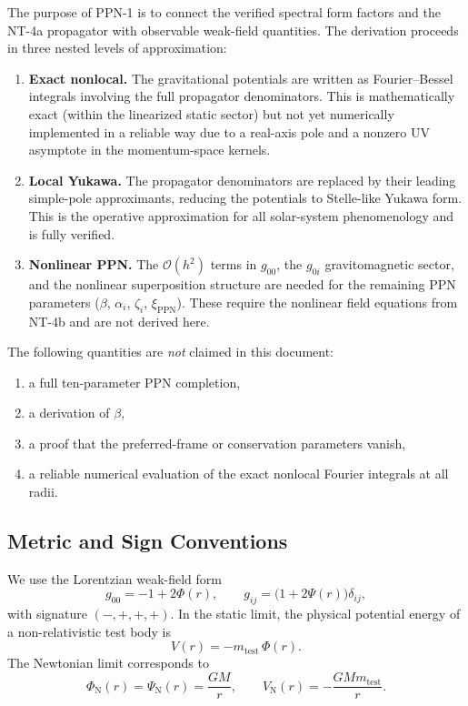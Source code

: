 \documentclass[11pt,a4paper]{article}
\newcommand{\order}{\mathcal{O}}
\begin{document}
The purpose of PPN-1 is to connect the verified spectral form factors and
the NT-4a propagator with observable weak-field quantities.  The derivation
proceeds in three nested levels of approximation:

\begin{enumerate}[label=\textbf{Level \arabic*}:, leftmargin=4em]
  \item \textbf{Exact nonlocal.}  The gravitational potentials are written
    as Fourier--Bessel integrals involving the full propagator denominators.
    This is mathematically exact (within the linearized static sector) but
    not yet numerically implemented in a reliable way due to a real-axis
    pole and a nonzero UV asymptote in the momentum-space kernels.

  \item \textbf{Local Yukawa.}  The propagator denominators are replaced by
    their leading simple-pole approximants, reducing the potentials to
    Stelle-like Yukawa form.  This is the operative approximation for all
    solar-system phenomenology and is fully verified.

  \item \textbf{Nonlinear PPN.}  The $\order(h^2)$ terms in $g_{00}$, the
    $g_{0i}$ gravitomagnetic sector, and the nonlinear superposition
    structure are needed for the remaining PPN parameters ($\beta$,
    $\alpha_i$, $\zeta_i$, $\xi_\mathrm{PPN}$).  These require the
    nonlinear field equations from NT-4b and are not derived here.
\end{enumerate}

\noindent The following quantities are \emph{not} claimed in this document:
\begin{enumerate}[label=\alph*)]
  \item a full ten-parameter PPN completion,
  \item a derivation of $\beta$,
  \item a proof that the preferred-frame or conservation parameters vanish,
  \item a reliable numerical evaluation of the exact nonlocal Fourier
    integrals at all radii.
\end{enumerate}

\subsection{Metric and Sign Conventions}

We use the Lorentzian weak-field form
\begin{equation}\label{eq:metric}
  g_{00} = -1 + 2\Phi(r), \qquad
  g_{ij} = \bigl(1 + 2\Psi(r)\bigr)\delta_{ij},
\end{equation}
with signature $(-,+,+,+)$.  In the static limit, the physical potential
energy of a non-relativistic test body is
\begin{equation}
  V(r) = -m_{\mathrm{test}}\,\Phi(r).
\end{equation}
The Newtonian limit corresponds to
\begin{equation}\label{eq:newton}
  \Phi_{\mathrm{N}}(r) = \Psi_{\mathrm{N}}(r) = \frac{GM}{r},
  \qquad
  V_{\mathrm{N}}(r) = -\frac{GMm_{\mathrm{test}}}{r}.
\end{equation}
\end{document}
